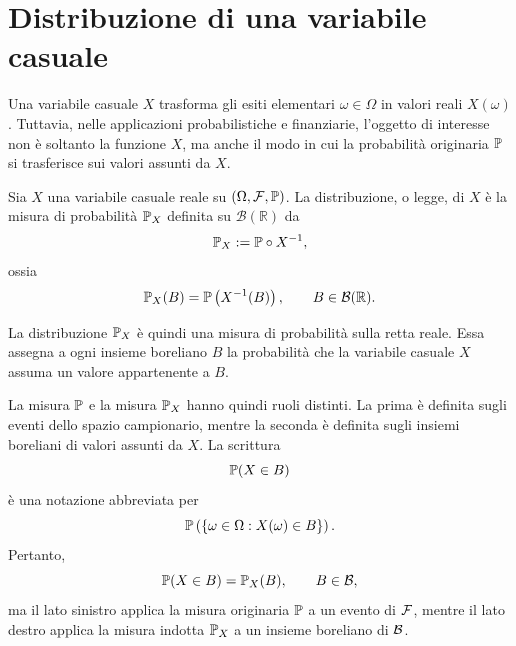 \section{Distribuzione di una variabile casuale}
\label{sec:cap2-distribuzione-vc}


Una variabile casuale $X$ trasforma gli esiti elementari $\omega\in\Omega$ in
valori reali $X(\omega)$. Tuttavia, nelle applicazioni probabilistiche e
finanziarie, l'oggetto di interesse non \`{e} soltanto la funzione $X$, ma anche
il modo in cui la probabilit\`{a} originaria $\mathbb{P}$ si trasferisce sui valori
assunti da $X$.


\begin{definition}
Sia $X$ una variabile casuale reale su $(\Omega,\mathcal{F},\mathbb{P})$. La distribuzione, o legge, di $X$ \`{e} la misura di probabilit\`{a} $\mathbb{P}_X$ definita su
$\mathcal{B}(\mathbb{R})$ da
\[
\mathbb{P}_X:=\mathbb{P}\circ X^{-1},
\]
ossia
\[
\mathbb{P}_X(B)
=
\mathbb{P}\left(X^{-1}(B)\right),
\qquad B\in\mathcal{B}(\mathbb{R}).
\]
\end{definition}
La distribuzione $\mathbb{P}_X$ \`{e} quindi una misura di probabilit\`{a} sulla retta
reale. Essa assegna a ogni insieme boreliano $B$ la probabilit\`{a} che la
variabile casuale $X$ assuma un valore appartenente a $B$. 

La misura $\mathbb{P}$ e la misura $\mathbb{P}_X$ hanno quindi ruoli distinti. La prima
\`{e} definita sugli eventi dello spazio campionario, mentre la seconda \`{e}
definita sugli insiemi boreliani di valori assunti da $X$. La scrittura
\[
\mathbb{P}(X\in B)
\]
\`{e} una notazione abbreviata per
\[
\mathbb{P}\left(\{\omega\in\Omega:X(\omega)\in B\}\right).
\]
Pertanto,
\[
\mathbb{P}(X\in B)=\mathbb{P}_X(B),
\qquad B\in\mathcal{B},
\]
ma il lato sinistro applica la misura originaria $\mathbb{P}$ a un evento di
$\mathcal{F}$, mentre il lato destro applica la misura indotta $\mathbb{P}_X$ a un insieme
boreliano di $\mathcal{B}$.

